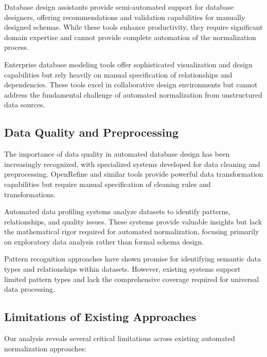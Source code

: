 \documentclass[acmsmall]{acmart}
\begin{document}
Database design assistants \cite{design_assist2018} provide semi-automated support for database designers, offering recommendations and validation capabilities for manually designed schemas. While these tools enhance productivity, they require significant domain expertise and cannot provide complete automation of the normalization process.

Enterprise database modeling tools \cite{enterprise_tools2020} offer sophisticated visualization and design capabilities but rely heavily on manual specification of relationships and dependencies. These tools excel in collaborative design environments but cannot address the fundamental challenge of automated normalization from unstructured data sources.

\subsection{Data Quality and Preprocessing}

The importance of data quality in automated database design has been increasingly recognized, with specialized systems developed for data cleaning and preprocessing. OpenRefine \cite{openrefine2013} and similar tools provide powerful data transformation capabilities but require manual specification of cleaning rules and transformations.

Automated data profiling systems \cite{data_profiling2017} analyze datasets to identify patterns, relationships, and quality issues. These systems provide valuable insights but lack the mathematical rigor required for automated normalization, focusing primarily on exploratory data analysis rather than formal schema design.

Pattern recognition approaches \cite{pattern_recog2019} have shown promise for identifying semantic data types and relationships within datasets. However, existing systems support limited pattern types and lack the comprehensive coverage required for universal data processing.

\subsection{Limitations of Existing Approaches}

Our analysis reveals several critical limitations across existing automated normalization approaches:
\end{document}
